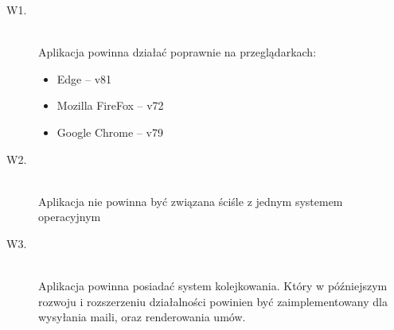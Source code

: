 \begin{description}
    \item[W1.] \hfill \\
    Aplikacja powinna działać poprawnie na przeglądarkach: 
    \begin{itemize}
        \item Edge – v81
        \item Mozilla FireFox – v72
        \item Google Chrome – v79
    \end{itemize}
    
    \item[W2.] \hfill \\
    Aplikacja nie powinna być związana ściśle z jednym systemem operacyjnym 
    
    \item[W3.] \hfill \\
    Aplikacja powinna posiadać system kolejkowania. Który w późniejszym rozwoju i rozszerzeniu działalności powinien być zaimplementowany dla wysyłania maili, oraz renderowania umów. 
\end{description}